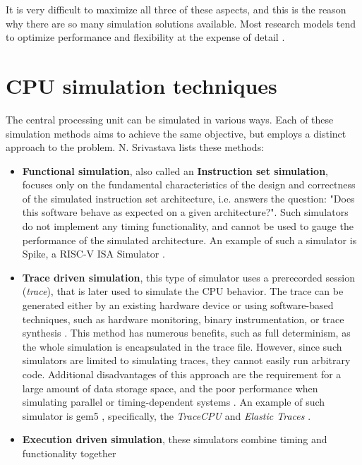It is very difficult to maximize all three of these aspects, and this is the reason why there are so many simulation
solutions available. Most research models tend to optimize performance and flexibility at the expense of detail
\cite{Simplescalar}.

\pagebreak
\section{CPU simulation techniques}

The central processing unit can be simulated in various ways. Each of these simulation methods aims to achieve the same
objective, but employs a distinct approach to the problem. N. Srivastava lists \cite{Nitish-Techniques} these methods:

\begin{itemize}
	\item{\textbf{Functional simulation}, also called an \textbf{Instruction set simulation}, focuses only on the
	fundamental characteristics of the design and correctness of the simulated instruction set architecture,
	i.e. answers the question: "Does this software behave as expected on a given architecture?". Such simulators do not implement any
	timing functionality, and cannot be used to gauge the performance of the simulated architecture. An example of such
	a simulator is Spike, a RISC-V ISA Simulator \cite{Spike}.}
	\item{\textbf{Trace driven simulation}, this type of simulator uses a prerecorded session (\textit{trace}), that is
	later used to simulate the CPU behavior. The trace can be generated either by an existing hardware device or
	using software-based techniques, such as hardware monitoring, binary instrumentation, or trace synthesis
	\cite{Simplescalar}. This method has numerous benefits, such as full determinism, as the whole simulation is
	encapsulated in the trace file. However, since such simulators are limited to simulating traces, they
	cannot easily run arbitrary code. Additional disadvantages of this approach are the requirement for a large
	amount of data storage space, and the poor performance when simulating parallel or timing-dependent systems
	\cite{TraceDrivenAccuracy}. An example of such simulator is gem5 \cite{gem5}, specifically, the \textit{TraceCPU}
	and \textit{Elastic Traces} \cite{gem5trace}.}
	\item{\textbf{Execution driven simulation}, these simulators combine timing and functionality together
}
\end{itemize}
